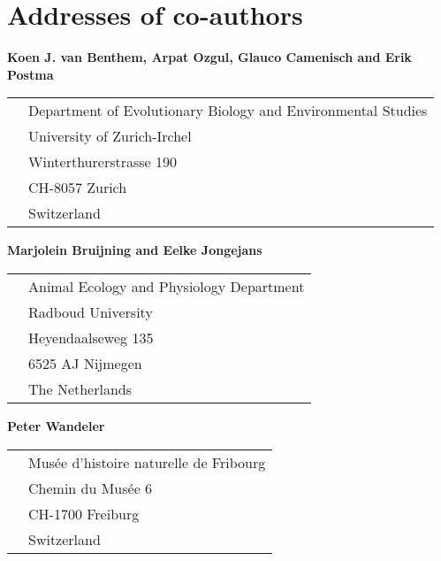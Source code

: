 \chapter*{Addresses of co-authors}

\textbf{\large
Koen J. van Benthem, Arpat Ozgul, Glauco Camenisch and Erik Postma}
\begin{table}[H]
\begin{tabular}{cl}
&Department of Evolutionary Biology and Environmental Studies\\
&University of Zurich-Irchel\\
&Winterthurerstrasse 190\\
&CH-8057 Zurich\\
&Switzerland\\
\end{tabular}
\end{table}

\noindent\textbf{\large
Marjolein Bruijning and Eelke Jongejans}
\begin{table}[H]
\begin{tabular}{cl}
&Animal Ecology and Physiology Department\\
&Radboud University\\
&Heyendaalseweg 135\\
&6525 AJ Nijmegen\\
&The Netherlands\\
\end{tabular}
\end{table}

\noindent\textbf{\large Peter Wandeler}
\begin{table}[H]
\begin{tabular}{cl}
&Mus\'ee d'histoire naturelle de Fribourg\\
&Chemin du Mus\'ee 6 \\
&CH-1700 Freiburg\\
&Switzerland\\
\end{tabular}
\end{table}